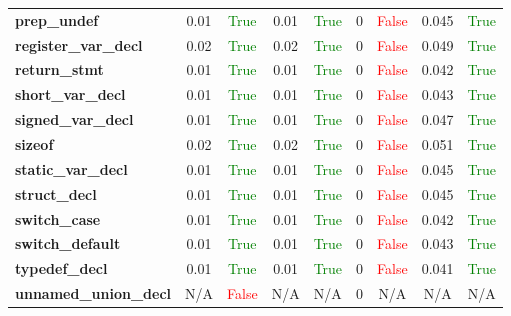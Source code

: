 \documentclass{article}
\begin{document}
\begin{xltabular}{\textwidth}{lcccccccc}
\textbf{{\fontsize{10}{12}\selectfont prep\_undef}}& 0.01&\textcolor{green}{True}& 0.01&\textcolor{green}{True}& 0&\textcolor{red}{False}& 0.045&\textcolor{green}{True} \\[0.5ex]
\textbf{{\fontsize{10}{12}\selectfont register\_var\_decl}}& 0.02&\textcolor{green}{True}& 0.02&\textcolor{green}{True}& 0&\textcolor{red}{False}& 0.049&\textcolor{green}{True} \\[0.5ex]
\textbf{{\fontsize{10}{12}\selectfont return\_stmt}}& 0.01&\textcolor{green}{True}& 0.01&\textcolor{green}{True}& 0&\textcolor{red}{False}& 0.042&\textcolor{green}{True} \\[0.5ex]
\textbf{{\fontsize{10}{12}\selectfont short\_var\_decl}}& 0.01&\textcolor{green}{True}& 0.01&\textcolor{green}{True}& 0&\textcolor{red}{False}& 0.043&\textcolor{green}{True} \\[0.5ex]
\textbf{{\fontsize{10}{12}\selectfont signed\_var\_decl}}& 0.01&\textcolor{green}{True}& 0.01&\textcolor{green}{True}& 0&\textcolor{red}{False}& 0.047&\textcolor{green}{True} \\[0.5ex]
\textbf{{\fontsize{10}{12}\selectfont sizeof}}& 0.02&\textcolor{green}{True}& 0.02&\textcolor{green}{True}& 0&\textcolor{red}{False}& 0.051&\textcolor{green}{True} \\[0.5ex]
\textbf{{\fontsize{10}{12}\selectfont static\_var\_decl}}& 0.01&\textcolor{green}{True}& 0.01&\textcolor{green}{True}& 0&\textcolor{red}{False}& 0.045&\textcolor{green}{True} \\[0.5ex]
\textbf{{\fontsize{10}{12}\selectfont struct\_decl}}& 0.01&\textcolor{green}{True}& 0.01&\textcolor{green}{True}& 0&\textcolor{red}{False}& 0.045&\textcolor{green}{True} \\[0.5ex]
\textbf{{\fontsize{10}{12}\selectfont switch\_case}}& 0.01&\textcolor{green}{True}& 0.01&\textcolor{green}{True}& 0&\textcolor{red}{False}& 0.042&\textcolor{green}{True} \\[0.5ex]
\textbf{{\fontsize{10}{12}\selectfont switch\_default}}& 0.01&\textcolor{green}{True}& 0.01&\textcolor{green}{True}& 0&\textcolor{red}{False}& 0.043&\textcolor{green}{True} \\[0.5ex]
\textbf{{\fontsize{10}{12}\selectfont typedef\_decl}}& 0.01&\textcolor{green}{True}& 0.01&\textcolor{green}{True}& 0&\textcolor{red}{False}& 0.041&\textcolor{green}{True} \\[0.5ex]
\textbf{{\fontsize{10}{12}\selectfont unnamed\_union\_decl}}& N/A&\textcolor{red}{False}& N/A&N/A& 0&N/A& N/A&N/A \\[0.5ex]

\end{xltabular}
\end{document}
